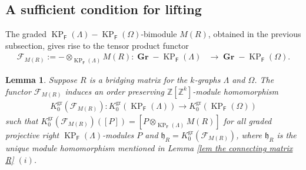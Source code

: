 \documentclass[12pt]{amsart}
\newcommand{\KP}{\operatorname{KP}}
\newtheorem{lem}[thm]{Lemma}
\theoremstyle{definition}
\theoremstyle{remark}
\newcommand{\gr}{\operatorname{gr}}
\newcommand{\Gr}{\operatorname{\textbf{Gr}}}
\begin{document}
\subsection{A sufficient condition for lifting}\label{ssec the condition}
The graded $\KP_\mathsf{F}(\Lambda)-\KP_\mathsf{F}(\Omega)$-bimodule $M(R)$, obtained in the previous subsection, gives rise to the tensor product functor
\begin{align*}
    \mathcal{F}_{M(R)}:=-\otimes_{\KP_\mathsf{F}(\Lambda)}M(R):\Gr\!-\KP_\mathsf{F}(\Lambda)&\longrightarrow \Gr\!-\KP_\mathsf{F}(\Omega).
\end{align*}
\begin{lem}\label{lem tensor product functor inducing group hom}
Suppose $R$ is a bridging matrix for the $k$-graphs $\Lambda$ and $\Omega$. The functor $\mathcal{F}_{M(R)}$ induces an order preserving $\mathbb{Z}[\mathbb{Z}^k]$-module homomorphism 
\begin{align*}
K_0^{\gr}(\mathcal{F}_{M(R)}):K_0^{\gr}(\KP_\mathsf{F}(\Lambda))\longrightarrow K_0^{\gr}(\KP_\mathsf{F}(\Omega))
\end{align*}
such that $K_0^{\gr}(\mathcal{F}_{M(R)})([P])= [P\otimes_{\KP_\mathsf{F}(\Lambda)}M(R)]$ for all graded projective right $\KP_\mathsf{F}(\Lambda)$-modules $P$ and $\mathfrak{h}_R=K_0^{\gr}(\mathcal{F}_{M(R)})$, where $\mathfrak{h}_R$ is the unique module homomorphism mentioned in Lemma \textup{\ref{lem the connecting matrix R}} $(i)$.     
\end{lem}
\end{document}
